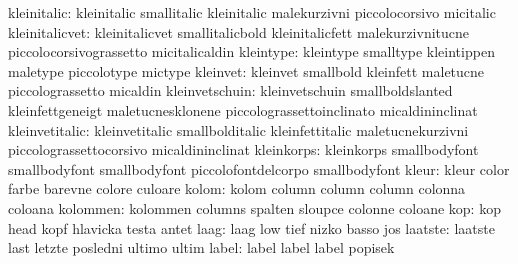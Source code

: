               kleinitalic: kleinitalic               smallitalic
                           kleinitalic               malekurzivni
                           piccolocorsivo            micitalic
           kleinitalicvet: kleinitalicvet            smallitalicbold
                           kleinitalicfett           malekurzivnitucne
                           piccolocorsivograssetto   micitalicaldin
                kleintype: kleintype                 smalltype
                           kleintippen               maletype
                           piccolotype               mictype
                 kleinvet: kleinvet                  smallbold
                           kleinfett                 maletucne
                           piccolograssetto          micaldin
           kleinvetschuin: kleinvetschuin            smallboldslanted
                           kleinfettgeneigt          maletucnesklonene
                           piccolograssettoinclinato micaldininclinat
           kleinvetitalic: kleinvetitalic            smallbolditalic
                           kleinfettitalic           maletucnekurzivni
                           piccolograssettocorsivo   micaldininclinat
               kleinkorps: kleinkorps                smallbodyfont
                           smallbodyfont             smallbodyfont
                           piccolofontdelcorpo       smallbodyfont %
                    kleur: kleur                     color
                           farbe                     barevne
                           colore                    culoare
                    kolom: kolom                     column
                           column                    column
                           colonna                   coloana %
                 kolommen: kolommen                  columns
                           spalten                   sloupce
                           colonne                   coloane
                      kop: kop                       head
                           kopf                      hlavicka
                           testa                     antet %
                     laag: laag                      low
                           tief                      nizko
                           basso                     jos
                  laatste: laatste                   last
                           letzte                    posledni
                           ultimo                    ultim
                    label: label                     label
                           label                     popisek
